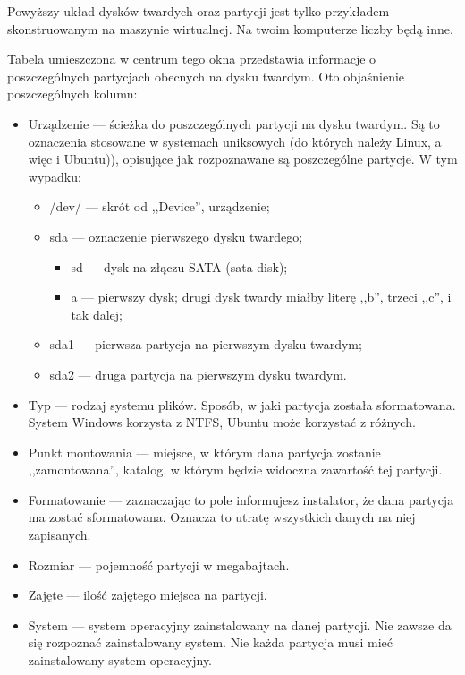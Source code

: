 Powyższy układ dysków twardych oraz partycji jest tylko przykładem skonstruowanym na maszynie wirtualnej. Na twoim komputerze liczby będą inne.

Tabela umieszczona w centrum tego okna przedstawia informacje o poszczególnych partycjach obecnych na dysku twardym. Oto objaśnienie poszczególnych kolumn:
\begin{itemize}
\item \textcolor{ubuntu_orange}{Urządzenie} --- ścieżka do poszczególnych partycji na dysku twardym. Są to oznaczenia stosowane w systemach uniksowych (do których należy Linux, a więc i Ubuntu)), opisujące jak rozpoznawane są poszczególne partycje. W tym wypadku:
        \begin{itemize}
        \item \textcolor{ubuntu_orange}{/dev/} --- skrót od ,,Device'', urządzenie;
        \item \textcolor{ubuntu_orange}{sda} --- oznaczenie pierwszego dysku twardego;
                \begin{itemize}
                        \item \textcolor{ubuntu_orange}{sd} --- dysk na złączu SATA (sata disk);
                        \item \textcolor{ubuntu_orange}{a} --- pierwszy dysk; drugi dysk twardy miałby literę ,,b'', trzeci ,,c'', i tak dalej;
                \end{itemize}
        \item \textcolor{ubuntu_orange}{sda1} --- pierwsza partycja na pierwszym dysku twardym;
        \item \textcolor{ubuntu_orange}{sda2} --- druga partycja na pierwszym dysku twardym.
        \end{itemize}
\item \textcolor{ubuntu_orange}{Typ} --- rodzaj systemu plików. Sposób, w jaki partycja została sformatowana. System Windows korzysta z NTFS, Ubuntu może korzystać z różnych.
\item \textcolor{ubuntu_orange}{Punkt montowania} --- miejsce, w którym dana partycja zostanie ,,zamontowana'', katalog, w którym będzie widoczna zawartość tej partycji.
\item \textcolor{ubuntu_orange}{Formatowanie} --- zaznaczając to pole informujesz instalator, że dana partycja ma zostać sformatowana. Oznacza to utratę wszystkich danych na niej zapisanych.
\item \textcolor{ubuntu_orange}{Rozmiar} --- pojemność partycji w megabajtach.
\item \textcolor{ubuntu_orange}{Zajęte} --- ilość zajętego miejsca na partycji.
\item \textcolor{ubuntu_orange}{System} --- system operacyjny zainstalowany na danej partycji. Nie zawsze da się rozpoznać zainstalowany system. Nie każda partycja musi mieć zainstalowany system operacyjny. 
\end{itemize}

